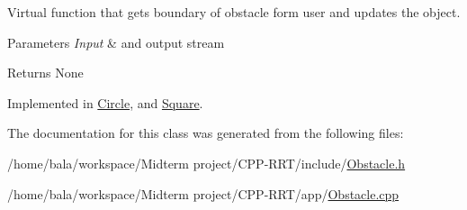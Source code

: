 Virtual function that gets boundary of obstacle form user and updates the object. 


\begin{DoxyParams}{Parameters}
{\em Input} & and output stream \\
\hline
\end{DoxyParams}
\begin{DoxyReturn}{Returns}
None 
\end{DoxyReturn}


Implemented in \hyperlink{classCircle_ad74925eb7a24bebd81cbef04ee174e6e}{Circle}, and \hyperlink{classSquare_a1979921c7ae05d518c4392e0d5b8c156}{Square}.



The documentation for this class was generated from the following files\+:\begin{DoxyCompactItemize}
\item 
/home/bala/workspace/\+Midterm project/\+C\+P\+P-\/\+R\+R\+T/include/\hyperlink{Obstacle_8h}{Obstacle.\+h}\item 
/home/bala/workspace/\+Midterm project/\+C\+P\+P-\/\+R\+R\+T/app/\hyperlink{Obstacle_8cpp}{Obstacle.\+cpp}\end{DoxyCompactItemize}

